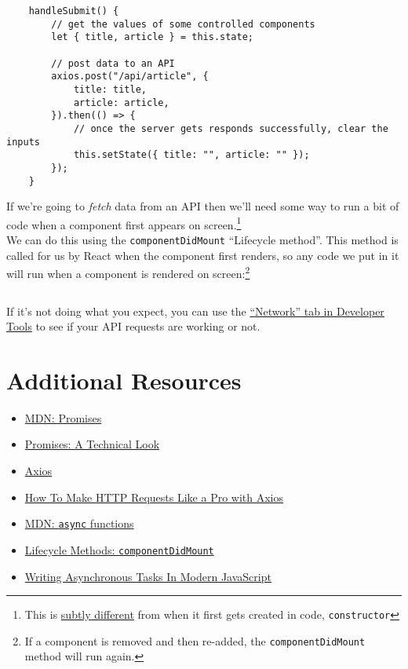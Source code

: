 \begin{verbatim}
    handleSubmit() {
        // get the values of some controlled components
        let { title, article } = this.state;

        // post data to an API
        axios.post("/api/article", {
            title: title,
            article: article,
        }).then(() => {
            // once the server gets responds successfully, clear the inputs
            this.setState({ title: "", article: "" });
        });
    }
\end{verbatim}

If we're going to \textit{fetch} data from an API then we'll need some way to run a bit of code when a component first appears on screen.\footnote{This is \href{https://medium.com/@mahcloud/actions-in-the-constructor-or-componentdidmount-be3720e4a9a6}{subtly different} from when it first gets created in code, \texttt{constructor}}
\\

We can do this using the \texttt{componentDidMount} ``Lifecycle method''. This method is called for us by React when the component first renders, so any code we put in it will run when a component is rendered on screen:\footnote{If a component is removed and then re-added, the \texttt{componentDidMount} method will run again.}

\inputminted{js}{05/figures/01-StarWarsFolks.jsx}

If it's not doing what you expect, you can use the \href{https://developer.mozilla.org/en-US/docs/Tools/Network_Monitor}{``Network'' tab in Developer Tools} to see if your API requests are working or not.


\section{Additional Resources}

\begin{itemize}[leftmargin=*]
    \item \href{https://developer.mozilla.org/en-US/docs/Web/JavaScript/Reference/Global_Objects/Promise}{MDN: Promises}
    \item \href{http://exploringjs.com/es6/ch_promises.html}{Promises: A Technical Look}
    \item \href{https://github.com/axios/axios}{Axios}
    \item \href{https://blog.logrocket.com/how-to-make-http-requests-like-a-pro-with-axios/}{How To Make HTTP Requests Like a Pro with Axios}
    \item \href{https://developer.mozilla.org/en-US/docs/Web/JavaScript/Reference/Statements/async_function}{MDN: \texttt{async} functions}
    \item \href{https://reactjs.org/docs/react-component.html#componentdidmount}{Lifecycle Methods: \texttt{componentDidMount}}
    \item \href{https://www.smashingmagazine.com/2019/10/asynchronous-tasks-modern-javascript/}{Writing Asynchronous Tasks In Modern JavaScript}
\end{itemize}
